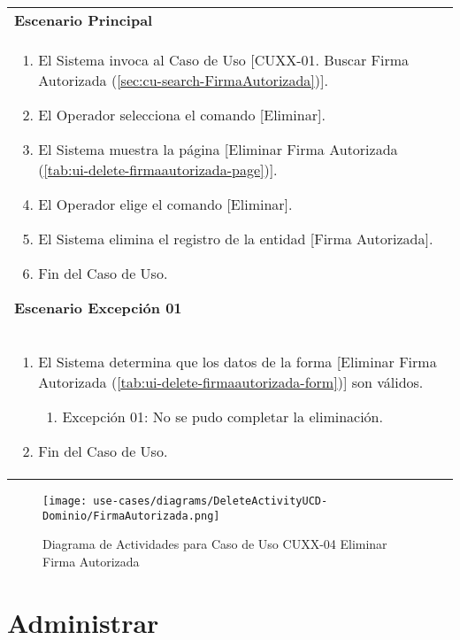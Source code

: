 	\begin{tabular}{ p{15.5cm} }
		\textbf{Escenario Principal} \\
		\begin{enumerate}
			\item El Sistema invoca al Caso de Uso [CUXX-01. Buscar Firma Autorizada (\ref{sec:cu-search-FirmaAutorizada})].
			\item El Operador selecciona el comando [Eliminar].
			\item El Sistema muestra la p\'agina [Eliminar Firma Autorizada (\ref{tab:ui-delete-firmaautorizada-page})].
			\item El Operador elige el comando [Eliminar].
			\item El Sistema elimina el registro de la entidad [Firma Autorizada].
			\item Fin del Caso de Uso.
		\end{enumerate}
		\textbf{Escenario Excepci\'on 01} \\
		\begin{enumerate}
		   \item El Sistema determina que los datos de la forma [Eliminar Firma Autorizada (\ref{tab:ui-delete-firmaautorizada-form})] son v\'alidos.
		   	\begin{enumerate}
		   		\item Excepci\'on 01: No se pudo completar la eliminaci\'on.
		    \end{enumerate}
		   \item Fin del Caso de Uso.
		\end{enumerate}
	\end{tabular}
	
	\begin{figure}[H]
	  \begin{center}
		 \label{tab:activity-delete-ucd-entity-firmaautorizada}
		 \texttt{[image: use-cases/diagrams/DeleteActivityUCD-Dominio/FirmaAutorizada.png]}
		 \caption{Diagrama de Actividades para Caso de Uso CUXX-04 Eliminar Firma Autorizada}
	  \end{center}
	\end{figure}
	
	\clearpage
	\section{Administrar } \label{sec:cf-uc-admin-instruccionefectivo}
	
